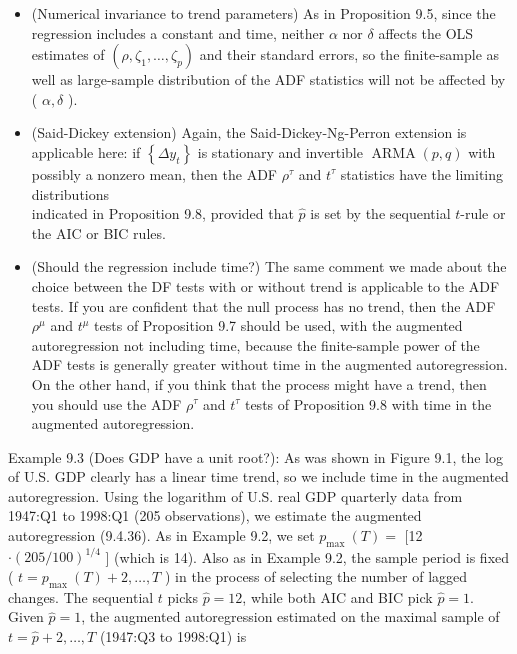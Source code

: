 \documentclass[10pt]{article}
\begin{document}
\begin{itemize}
  \item (Numerical invariance to trend parameters) As in Proposition 9.5, since the regression includes a constant and time, neither $\alpha$ nor $\delta$ affects the OLS estimates of $\left(\rho, \zeta_{1}, \ldots, \zeta_{p}\right)$ and their standard errors, so the finite-sample as well as large-sample distribution of the ADF statistics will not be affected by ( $\alpha, \delta$ ).
  \item (Said-Dickey extension) Again, the Said-Dickey-Ng-Perron extension is applicable here: if $\left\{\Delta y_{t}\right\}$ is stationary and invertible $\operatorname{ARMA}(p, q)$ with possibly a nonzero mean, then the ADF $\rho^{\tau}$ and $t^{\tau}$ statistics have the limiting distributions\\
indicated in Proposition 9.8, provided that $\hat{p}$ is set by the sequential $t$-rule or the AIC or BIC rules.
  \item (Should the regression include time?) The same comment we made about the choice between the DF tests with or without trend is applicable to the ADF tests. If you are confident that the null process has no trend, then the ADF $\rho^{\mu}$ and $t^{\mu}$ tests of Proposition 9.7 should be used, with the augmented autoregression not including time, because the finite-sample power of the ADF tests is generally greater without time in the augmented autoregression. On the other hand, if you think that the process might have a trend, then you should use the ADF $\rho^{\tau}$ and $t^{\tau}$ tests of Proposition 9.8 with time in the augmented autoregression.
\end{itemize}

Example 9.3 (Does GDP have a unit root?): As was shown in Figure 9.1, the log of U.S. GDP clearly has a linear time trend, so we include time in the augmented autoregression. Using the logarithm of U.S. real GDP quarterly data from 1947:Q1 to 1998:Q1 (205 observations), we estimate the augmented autoregression (9.4.36). As in Example 9.2, we set $p_{\text {max }}(T)=$ [12 $\cdot(205 / 100)^{1 / 4}$ ] (which is 14). Also as in Example 9.2, the sample period is fixed ( $t=p_{\text {max }}(T)+2, \ldots, T$ ) in the process of selecting the number of lagged changes. The sequential $t$ picks $\hat{p}=12$, while both AIC and BIC pick $\hat{p}=1$. Given $\hat{p}=1$, the augmented autoregression estimated on the maximal sample of $t=\hat{p}+2, \ldots, T$ (1947:Q3 to 1998:Q1) is
\end{document}
